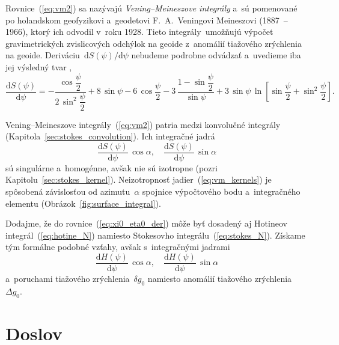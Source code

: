 \documentclass[a4paper,12pt]{book}
\newcommand{\diff}{\mathrm d}
\begin{document}
Rovnice~(\ref{eq:vm2}) sa nazývajú \emph{Vening--Meineszove integrály} a~sú 
pomenované po holandskom geofyzikovi a~geodetovi F.~A.~Veningovi Meineszovi 
(1887~-- 1966), ktorý ich odvodil v~roku 1928.  Tieto integrály~umožňujú 
výpočet gravimetrických zvislicových odchýlok na geoide z~anomálií tiažového 
zrýchlenia na geoide.  Deriváciu~$\diff S(\psi) \slash \diff\psi$ nebudeme 
podrobne odvádzať a~uvedieme iba jej výsledný tvar
\parencite{MoritzPhysicalGeodesy},
%
\begin{equation}
\frac{\diff S(\psi)}{\diff \psi} = - \frac{\cos\dfrac{\psi}{2}}{2 \, 
\sin^2\dfrac{\psi}{2}} + 8 \, \sin\psi - 6 \, \cos\dfrac{\psi}{2} - 3\, \frac{1 
- \sin\dfrac{\psi}{2}}{\sin\psi} + 3 \, \sin\psi \, \ln \left[ 
\sin\dfrac{\psi}{2} + \sin^2\dfrac{\psi}{2} \right]{.}
\end{equation}

Vening--Meineszove integrály~(\ref{eq:vm2}) patria medzi konvolučné integrály 
(Kapitola~\ref{sec:stokes_convolution}).  Ich integračné jadrá
%
\begin{equation}
\label{eq:vm_kernels}
\frac{\diff S(\psi)}{\diff\psi} \, \cos\alpha{,} \quad \frac{\diff 
S(\psi)}{\diff\psi} \, \sin\alpha
\end{equation}
%
sú singulárne a~homogénne, avšak nie sú izotropne (pozri 
Kapitolu~\ref{sec:stokes_kernel}).  Neizotropnosť jadier~(\ref{eq:vm_kernels}) 
je spôsobená závislosťou od azimutu~$\alpha$ spojnice výpočtového bodu 
a~integračného elementu (Obrázok~\ref{fig:surface_integral}).

Dodajme, že do rovnice~(\ref{eq:xi0_eta0_der}) môže byť dosadený aj Hotineov 
integrál~(\ref{eq:hotine_N}) namiesto Stokesovho integrálu~(\ref{eq:stokes_N}).  
Získame tým formálne podobné vzťahy, avšak s~integračnými jadrami
%
\begin{equation}
\label{eq:vm_kernels2}
\frac{\diff H(\psi)}{\diff\psi} \, \cos\alpha{,} \quad \frac{\diff 
H(\psi)}{\diff\psi} \, \sin\alpha
\end{equation}
%
a~poruchami tiažového zrýchlenia~$\delta g_0$ namiesto anomálií tiažového 
zrýchlenia~$\Delta g_0$.






\chapter*{Doslov}
\end{document}
